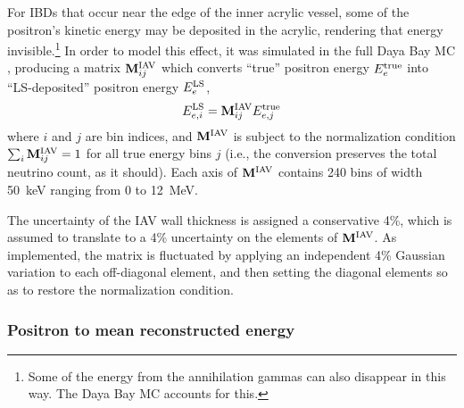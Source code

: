 \documentclass[../thesis.tex]{subfiles}
\begin{document}
For IBDs that occur near the edge of the inner acrylic vessel, some of the positron's kinetic energy may be deposited in the acrylic, rendering that energy invisible.\footnote{Some of the energy from the annihilation gammas can also disappear in this way. The Daya Bay MC accounts for this.} In order to model this effect, it was simulated in the full Daya Bay MC \cite{TruePromptSpec}, producing a matrix $\mathbf{M}^{\mathrm{IAV}}_{ij}$ which converts ``true'' positron energy $E^{\mathrm{true}}_{e}$ into ``LS-deposited'' positron energy $E^{\mathrm{LS}}_{e}$,
\begin{equation}
  \label{eq:Miav}
  E^{\mathrm{LS}}_{e,i} = \mathbf{M}^{\mathrm{IAV}}_{ij} E^{\mathrm{true}}_{e,j}
\end{equation}
where $i$ and $j$ are bin indices, and $\mathbf{M}^{\mathrm{IAV}}$ is subject to the normalization condition $\sum_i\mathbf{M}^{\mathrm{IAV}}_{ij} = 1$ for all true energy bins $j$ (i.e., the conversion preserves the total neutrino count, as it should). Each axis of $\mathbf{M}^{\mathrm{IAV}}$ contains 240 bins of width 50~keV ranging from 0 to 12~MeV.

The uncertainty of the IAV wall thickness is assigned a conservative 4\%, which is assumed to translate to a 4\% uncertainty on the elements of $\mathbf{M}^{\mathrm{IAV}}$. As implemented, the matrix is fluctuated by applying an independent 4\% Gaussian variation to each off-diagonal element, and then setting the diagonal elements so as to restore the normalization condition.

\subsubsection{Positron to mean reconstructed energy}
\end{document}
